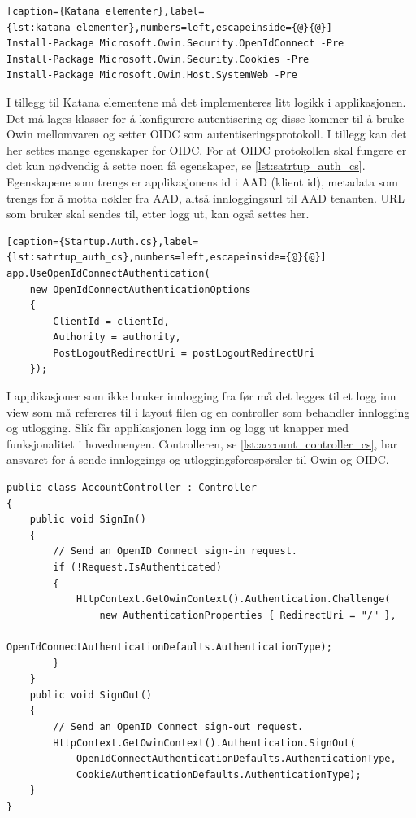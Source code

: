 \begin{lstlisting}[caption={Katana elementer},label={lst:katana_elementer},numbers=left,escapeinside={@}{@}]
Install-Package Microsoft.Owin.Security.OpenIdConnect -Pre
Install-Package Microsoft.Owin.Security.Cookies -Pre
Install-Package Microsoft.Owin.Host.SystemWeb -Pre
\end{lstlisting}

\bigskip
I tillegg til Katana elementene må det implementeres litt logikk i applikasjonen. Det må lages klasser for å konfigurere autentisering og disse kommer til å bruke Owin mellomvaren og setter OIDC som autentiseringsprotokoll. I tillegg kan det her settes mange egenskaper for OIDC. For at OIDC protokollen skal fungere er det kun nødvendig å sette noen få egenskaper, se \ref{lst:satrtup_auth_cs}. Egenskapene som trengs er applikasjonens id i AAD (klient id), metadata som trengs for å motta nøkler fra AAD, altså innloggingsurl til AAD tenanten. URL som bruker skal sendes til, etter logg ut, kan også settes her. 

\begin{lstlisting}[caption={Startup.Auth.cs},label={lst:satrtup_auth_cs},numbers=left,escapeinside={@}{@}]
app.UseOpenIdConnectAuthentication(
    new OpenIdConnectAuthenticationOptions
    {
        ClientId = clientId,
        Authority = authority,
        PostLogoutRedirectUri = postLogoutRedirectUri
    });
\end{lstlisting}

\bigskip
I applikasjoner som ikke bruker innlogging fra før må det legges til et logg inn view som må refereres til i layout filen og en controller som behandler innlogging og utlogging. Slik får applikasjonen logg inn og logg ut knapper med funksjonalitet i hovedmenyen. Controlleren, se \ref{lst:account_controller_cs}, har ansvaret for å sende innloggings og utloggingsforespørsler til Owin og OIDC. 

\begin{lstlisting}[caption={AccountController.cs},label={lst:account_controller_cs}]
public class AccountController : Controller
{
    public void SignIn()
    {
        // Send an OpenID Connect sign-in request.
        if (!Request.IsAuthenticated)
        {
            HttpContext.GetOwinContext().Authentication.Challenge(
                new AuthenticationProperties { RedirectUri = "/" }, 
                OpenIdConnectAuthenticationDefaults.AuthenticationType);
        }
    }
    public void SignOut()
    {
        // Send an OpenID Connect sign-out request.
        HttpContext.GetOwinContext().Authentication.SignOut(
            OpenIdConnectAuthenticationDefaults.AuthenticationType, 
            CookieAuthenticationDefaults.AuthenticationType);
    }
}
\end{lstlisting}

